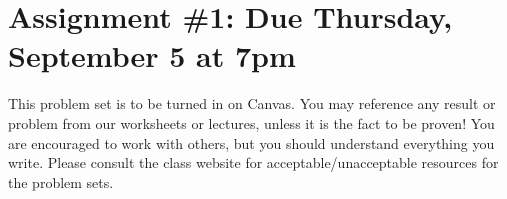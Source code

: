 \documentclass[12pt]{amsart}
\newcommand{\showsol}[1]{\def\displaysol{#1}}
\begin{document}
\showsol{1}
	
	\thispagestyle{empty}
	
	\section*{Assignment \#1: Due Thursday, September 5 at 7pm}
	
	This problem set is to be turned in on Canvas. You may reference any result or problem from our worksheets or lectures, unless it is the fact to be proven! You are encouraged to work with others, but you should understand everything you write. Please consult the class website for acceptable/unacceptable resources for the problem sets.
	
	\
	
	
\end{document}
